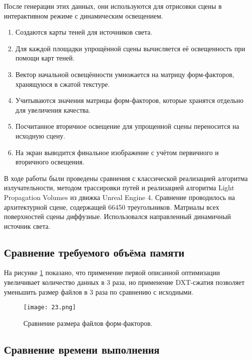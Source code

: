 \documentclass[12pt,fleqn]{article}
\begin{document}
После генерации этих данных, они используются для отрисовки сцены в интерактивном режиме с динамическим освещением.

\begin{enumerate}

\item Создаются карты теней для источников света.

\item Для каждой площадки упрощённой сцены вычисляется её освещенность при помощи карт теней.

\item Вектор начальной освещённости умножается на матрицу форм-факторов, хранящуюся в сжатой текстуре.

\item Учитываются значения матрицы форм-факторов, которые хранятся отдельно для увеличения качества.

\item Посчитанное вторичное освещение для упрощенной сцены переносится на исходную сцену.

\item На экран выводится финальное изображение с учётом первичного и вторичного освещения.

\end{enumerate}

В ходе работы были проведены сравнения с классической реализацией алгоритма излучательности, методом трассировки путей и реализацией алгоритма Light Propagation Volumes из движка Unreal Engine 4. Сравнение проводилось на архитектурной сцене, содержащей 66450 треугольников. Матриалы всех поверхностей сцены диффузные. Использовался направленный динамичный источник света.

\subsection{Сравнение требуемого объёма памяти}

На рисунке \ref{size_comparison} показано, что применение первой описанной оптимизации увеличивает количество данных в 3 раза, но применение DXT-сжатия позволяет уменьшить размер файлов в 3 раза по сравнению с исходными.

\begin{figure}[htb]
    \centering
    \texttt{[image: 23.png]}
    \caption{Сравнение размера файлов форм-факторов.}
    \label{size_comparison}
\end{figure}

\subsection{Сравнение времени выполнения}
\end{document}
